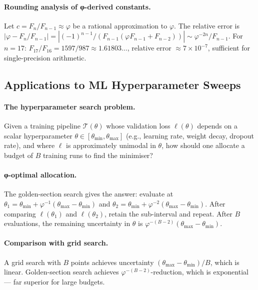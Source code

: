 \paragraph{Rounding analysis of φ-derived constants.}
Let \(c = F_n / F_{n-1} \approx \varphi\) be a rational approximation
to \(\varphi\).  The relative error is
\(|\varphi - F_n/F_{n-1}| = |(-1)^{n-1}/(F_{n-1}(\varphi F_{n-1} + F_{n-2}))| \sim \varphi^{-2n}/F_{n-1}\).
For \(n = 17\): \(F_{17}/F_{16} = 1597/987 \approx 1.61803\ldots\),
relative error \(\approx 7 \times 10^{-7}\), sufficient for
single-precision arithmetic.

\subsection{Applications to ML Hyperparameter Sweeps}
\label{subsec:gh-ml-sweeps}

\paragraph{The hyperparameter search problem.}
Given a training pipeline \(\mathcal{T}(\theta)\) whose validation
loss \(\ell(\theta)\) depends on a scalar hyperparameter
\(\theta \in [\theta_{\min}, \theta_{\max}]\) (e.g., learning rate,
weight decay, dropout rate), and where \(\ell\) is approximately
unimodal in \(\theta\), how should one allocate a budget of
\(B\) training runs to find the minimiser?

\paragraph{φ-optimal allocation.}
The golden-section search gives the answer: evaluate at
\(\theta_1 = \theta_{\min} + \varphi^{-1}(\theta_{\max}-\theta_{\min})\)
and
\(\theta_2 = \theta_{\min} + \varphi^{-2}(\theta_{\max}-\theta_{\min})\).
After comparing \(\ell(\theta_1)\) and \(\ell(\theta_2)\),
retain the sub-interval and repeat.  After \(B\) evaluations,
the remaining uncertainty in \(\theta\) is
\(\varphi^{-(B-2)}(\theta_{\max}-\theta_{\min})\).

\paragraph{Comparison with grid search.}
A grid search with \(B\) points achieves uncertainty
\((\theta_{\max}-\theta_{\min})/B\), which is linear.
Golden-section search achieves \(\varphi^{-(B-2)}\)-reduction,
which is exponential — far superior for large budgets.

